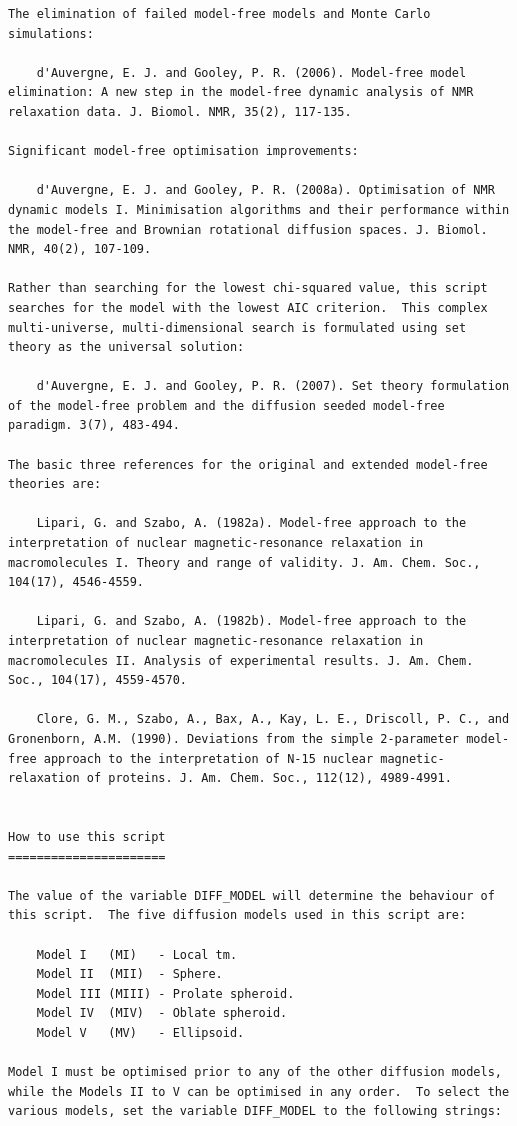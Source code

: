 \begin{htmlonly}
\begin{htmlonly}
\begin{lstlisting}
The elimination of failed model-free models and Monte Carlo simulations:

    d'Auvergne, E. J. and Gooley, P. R. (2006). Model-free model elimination: A new step in the model-free dynamic analysis of NMR relaxation data. J. Biomol. NMR, 35(2), 117-135.

Significant model-free optimisation improvements:

    d'Auvergne, E. J. and Gooley, P. R. (2008a). Optimisation of NMR dynamic models I. Minimisation algorithms and their performance within the model-free and Brownian rotational diffusion spaces. J. Biomol. NMR, 40(2), 107-109.

Rather than searching for the lowest chi-squared value, this script searches for the model with the lowest AIC criterion.  This complex multi-universe, multi-dimensional search is formulated using set theory as the universal solution:

    d'Auvergne, E. J. and Gooley, P. R. (2007). Set theory formulation of the model-free problem and the diffusion seeded model-free paradigm. 3(7), 483-494.

The basic three references for the original and extended model-free theories are:

    Lipari, G. and Szabo, A. (1982a). Model-free approach to the interpretation of nuclear magnetic-resonance relaxation in macromolecules I. Theory and range of validity. J. Am. Chem. Soc., 104(17), 4546-4559.

    Lipari, G. and Szabo, A. (1982b). Model-free approach to the interpretation of nuclear magnetic-resonance relaxation in macromolecules II. Analysis of experimental results. J. Am. Chem. Soc., 104(17), 4559-4570.

    Clore, G. M., Szabo, A., Bax, A., Kay, L. E., Driscoll, P. C., and Gronenborn, A.M. (1990). Deviations from the simple 2-parameter model-free approach to the interpretation of N-15 nuclear magnetic-relaxation of proteins. J. Am. Chem. Soc., 112(12), 4989-4991.


How to use this script
======================

The value of the variable DIFF_MODEL will determine the behaviour of this script.  The five diffusion models used in this script are:

    Model I   (MI)   - Local tm.
    Model II  (MII)  - Sphere.
    Model III (MIII) - Prolate spheroid.
    Model IV  (MIV)  - Oblate spheroid.
    Model V   (MV)   - Ellipsoid.

Model I must be optimised prior to any of the other diffusion models, while the Models II to V can be optimised in any order.  To select the various models, set the variable DIFF_MODEL to the following strings:


\end{lstlisting}
\end{htmlonly}
\end{htmlonly}
